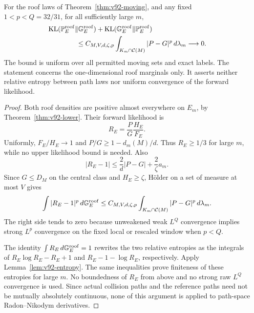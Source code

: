 \begin{theorem}
\label{thm:v92-entropy}
For the roof laws of Theorem~\ref{thm:v92-moving}, and any fixed
$1<p<Q=32/31$, for all sufficiently large $m$,
\begin{align}
 &\operatorname{KL}(\mathbb P_E^{\rm roof}\Vert\mathbb G_E^{\rm roof})
 +\operatorname{KL}(\mathbb G_E^{\rm roof}\Vert\mathbb P_E^{\rm roof})
                                                        \notag\\
 &\hspace{15mm}\le C_{M,V,d,\zeta,p}
       \int_{K_m\cap\mathcal C(M)}|P-G|^p\,d\lambda_m
                              \longrightarrow0.\label{eq:v92-entropy-limit}
\end{align}
The bound is uniform over all permitted moving sets and exact labels.
The statement concerns the one-dimensional roof marginals only.
It asserts neither relative entropy between path laws nor uniform
convergence of the forward likelihood.
\end{theorem}
\begin{proof}
Both roof densities are positive almost everywhere on $E_m$, by
Theorem~\ref{thm:v92-lower}. Their forward likelihood is
\[
 R_E=\frac{P}{G}\frac{H_E}{F_E}.
\]
Uniformly, $F_E/H_E\to1$ and $P/G\ge1-d_m(M)/d$. Thus $R_E\ge1/3$
for large $m$, while no upper likelihood bound is needed. Also
\begin{equation}\label{eq:v92-likelihood-lp}
 |R_E-1|\le\frac{2}{d}|P-G|+\frac{2}{\zeta}a_m.
\end{equation}
Since $G\le D_M$ on the central class and $H_E\ge\zeta$,
H\"older on a set of measure at most $V$ gives
\[
 \int|R_E-1|^p\,d\mathbb G_E^{\rm roof}
 \le C_{M,V,d,\zeta,p}
           \int_{K_m\cap\mathcal C(M)}|P-G|^p\,d\lambda_m.
\]
The right side tends to zero because unweakened weak $L^Q$
convergence implies strong $L^p$ convergence on the fixed local or
rescaled window when $p<Q$.

The identity $\int R_E\,d\mathbb G_E^{\rm roof}=1$ rewrites the two
relative entropies as the integrals of $R_E\log R_E-R_E+1$ and
$R_E-1-\log R_E$, respectively. Apply Lemma~\ref{lem:v92-entropy}.
The same inequalities prove finiteness of these entropies for large
$m$. No boundedness of $R_E$ from above and no strong raw $L^Q$
convergence is used. Since actual collision paths and the reference
paths need not be mutually absolutely continuous, none of this
argument is applied to path-space Radon--Nikodym derivatives.
\end{proof}

